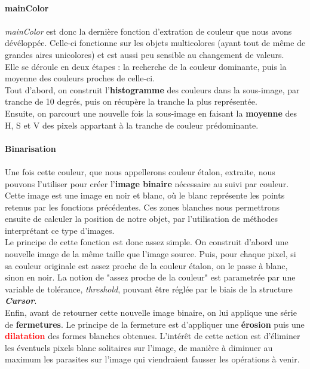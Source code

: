 \documentclass{report}
\begin{document}
						\paragraph{mainColor} \paragraph{}
						\textit{mainColor} est donc la dernière fonction d'extration de couleur que nous avons dévéloppée. Celle-ci fonctionne sur les objets multicolores (ayant tout de même de grandes aires unicolores) et est aussi peu sensible au changement de valeurs.\\
						Elle se déroule en deux étapes : la recherche de la couleur dominante, puis la moyenne des couleurs proches de celle-ci. \\Tout d'abord, on construit l'\textbf{histogramme} des couleurs dans la sous-image, par tranche de 10 degrés, puis on récupère la tranche la plus représentée.\\
Ensuite, on parcourt une nouvelle fois la sous-image en faisant la \textbf{moyenne} des H, S et V des pixels appartant à la tranche de couleur prédominante.

						
						\paragraph{Binarisation} \paragraph{}
							Une fois cette couleur, que nous appellerons couleur étalon, extraite, nous pouvons l'utiliser pour créer l'\textbf{image binaire} nécessaire au suivi par couleur. Cette image est une image en noir et blanc, où le blanc représente les points retenus par les fonctions précédentes. Ces zones blanches nous permettrons ensuite de calculer la position de notre objet, par l'utilisation de méthodes interprétant ce type d'images.\\
							Le principe de cette fonction est donc assez simple. On construit d'abord une nouvelle image de la même taille que l'image source. Puis, pour chaque pixel, si sa couleur originale est assez proche de la couleur étalon, on le passe à blanc, sinon en noir. La notion de "assez proche de la couleur" est parametrée par une variable de tolérance, \textit{threshold}, pouvant être réglée par le biais de la structure \textbf{\textit{Cursor}}.\\
							Enfin, avant de retourner cette nouvelle image binaire, on lui applique une série de \textbf{fermetures}. Le principe de la fermeture est d'appliquer une \textbf{\textcolor{vert}{érosion}} puis une \textbf{\textcolor{red}{dilatation}} des formes blanches obtenues. L'intérêt de cette action est d'éliminer les éventuels pixels blanc solitaires sur l'image, de manière à diminuer au maximum les parasites sur l'image qui viendraient fausser les opérations à venir.
					\newpage
\end{document}
